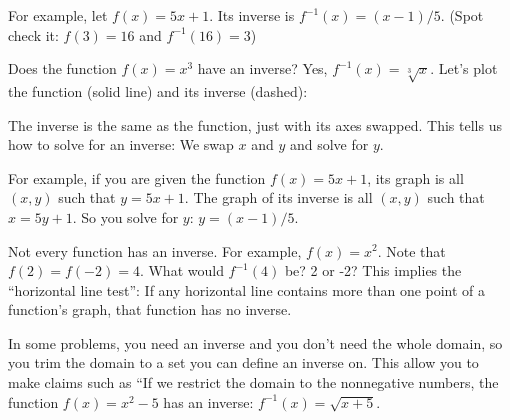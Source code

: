 For example, let $f(x) = 5x + 1$. Its inverse is
$f^{-1}(x) = (x - 1)/5$. (Spot check it: $f(3) = 16$ and $f^{-1}(16) = 3$)

Does the function $f(x) = x^3$ have an inverse? Yes, $f^{-1}(x) =
\sqrt[3]{x}$. Let's plot the function (solid line) and its inverse (dashed):


The inverse is the same as the function, just with its axes swapped.
This tells us how to solve for an inverse: We swap $x$ and $y$ and
solve for $y$.

For example, if you are given the function $f(x) = 5x + 1$, its graph
is all $(x,y)$ such that $y = 5x + 1$.  The graph of its inverse is
all $(x, y)$ such that $x = 5y + 1$. So you solve for $y$: $y = (x -
1)/5$.

Not every function has an inverse.  For example, $f(x) = x^2$.  Note
that $f(2) = f(-2) = 4$.  What would $f^{-1}(4)$ be? 2 or -2?  This
implies the ``horizontal line test'': If any horizontal line contains
more than one point of a function's graph, that function has no
inverse.

In some problems, you need an inverse and you don't  need the
whole domain, so you trim the domain to a set you can define an
inverse on. This allow you to make claims such as ``If we restrict the domain to
the nonnegative numbers, the function $f(x) = x^2 - 5$ has an inverse:
$f^{-1}(x) =\sqrt{x + 5}$.

